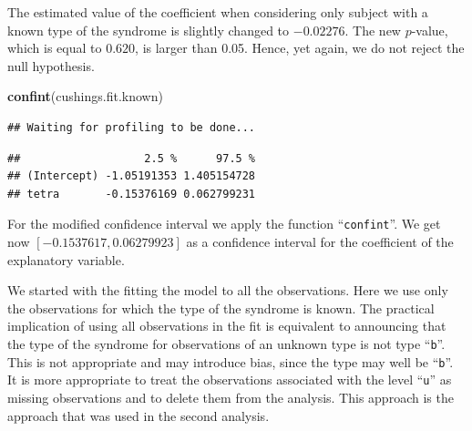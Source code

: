 \documentclass[]{krantz}
\makeatletter
\newenvironment{Shaded}{\begin{snugshade}}{\end{snugshade}}
\newcommand{\KeywordTok}[1]{\textcolor[rgb]{0.13,0.29,0.53}{\textbf{#1}}}
\newcommand{\NormalTok}[1]{#1}
\newenvironment{kframe}{%
\medskip{}
\setlength{\fboxsep}{.8em}
 \def\at@end@of@kframe{}%
 \ifinner\ifhmode%
  \def\at@end@of@kframe{\end{minipage}}%
  \begin{minipage}{\columnwidth}%
 \fi\fi%
 \def\FrameCommand##1{\hskip\@totalleftmargin \hskip-\fboxsep
 \colorbox{shadecolor}{##1}\hskip-\fboxsep
     \hskip-\linewidth \hskip-\@totalleftmargin \hskip\columnwidth}%
 \MakeFramed {\advance\hsize-\width
   \@totalleftmargin\z@ \linewidth\hsize
   \@setminipage}}%
 {\par\unskip\endMakeFramed%
 \at@end@of@kframe}
\renewenvironment{Shaded}{\begin{kframe}}{\end{kframe}}
\theoremstyle{definition}
\theoremstyle{definition}
\theoremstyle{definition}
\theoremstyle{remark}
\makeatother
\begin{document}
\begin{enumerate}
  The estimated value of the coefficient when considering only subject
  with a known type of the syndrome is slightly changed to \(-0.02276\). The
  new \(p\)-value, which is equal to \(0.620\), is larger than 0.05. Hence,
  yet again, we do not reject the null hypothesis.

\begin{Shaded}
\begin{Highlighting}[]
\KeywordTok{confint}\NormalTok{(cushings.fit.known)}
\end{Highlighting}
\end{Shaded}

\begin{verbatim}
## Waiting for profiling to be done...
\end{verbatim}

\begin{verbatim}
##                   2.5 %      97.5 %
## (Intercept) -1.05191353 1.405154728
## tetra       -0.15376169 0.062799231
\end{verbatim}

  For the modified confidence interval we apply the function ``\texttt{confint}''.
  We get now \([-0.1537617, 0.06279923]\) as a confidence interval for the
  coefficient of the explanatory variable.

  We started with the fitting the model to all the observations. Here we
  use only the observations for which the type of the syndrome is known.
  The practical implication of using all observations in the fit is
  equivalent to announcing that the type of the syndrome for observations
  of an unknown type is not type ``\texttt{b}''. This is not appropriate and may
  introduce bias, since the type may well be ``\texttt{b}''. It is more appropriate
  to treat the observations associated with the level ``\texttt{u}'' as missing
  observations and to delete them from the analysis. This approach is the
  approach that was used in the second analysis.
\end{enumerate}



\backmatter
\printindex
\end{document}
